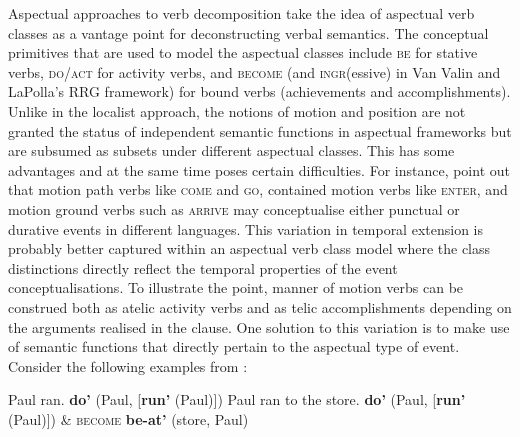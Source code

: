 Aspectual approaches to verb decomposition take the idea of aspectual verb classes as a vantage point for deconstructing verbal semantics. The conceptual primitives that are used to model the aspectual classes include \textsc{be} for stative verbs, \textsc{do/act} for activity verbs, and \textsc{become} (and \textsc{ingr}(essive) in Van Valin and LaPolla's RRG framework) for bound verbs (achievements and accomplishments). Unlike in the localist approach, the notions of motion and position are not granted the status of independent semantic functions in aspectual frameworks but are subsumed as subsets under different aspectual classes. This has some advantages and at the same time poses certain difficulties. For instance, \citet[106]{van1997syntax} point out that motion path verbs like \textsc{come} and \textsc{go}, contained motion verbs like \textsc{enter}, and motion ground verbs such as \textsc{arrive} may conceptualise either punctual or durative events in different languages. This variation in temporal extension is probably better captured within an aspectual verb class model where the class distinctions directly reflect the temporal properties of the event conceptualisations. To illustrate the point, manner of motion verbs can be construed both as atelic activity verbs and as telic accomplishments depending on the arguments realised in the clause. One solution to this variation is to make use of semantic functions that directly pertain to the aspectual type of event. Consider the following examples from \citet[111]{van1997syntax}:

\ea \label{VanValin:run}
\ea Paul ran. \label{VanValin:runa}
 \textbf{do'} (Paul, [\textbf{run'} (Paul)])
\ex Paul ran to the store. \label{VanValin:runb}
 \textbf{do'} (Paul, [\textbf{run'} (Paul)]) \& \textsc{become} \textbf{be-at'} (store, Paul)
\z
\z

